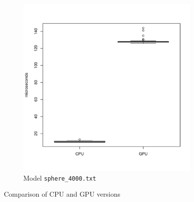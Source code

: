 \begin{figure}
		\begin{subfigure}[b]{0.45\textwidth}
			\includegraphics[width=\textwidth]{results/sphere_4000}
			\caption{Model \texttt{sphere\_4000.txt}}
		\end{subfigure}
		\caption[]{Comparison of CPU and GPU versions}
		\label{fig:results}
	\end{figure}
